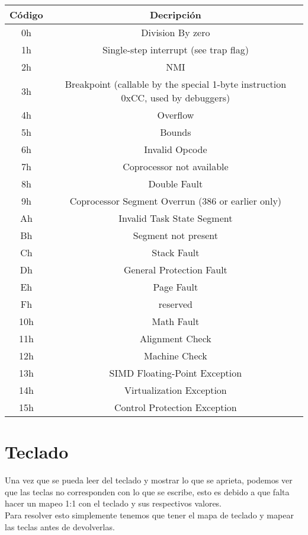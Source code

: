 \documentclass[]{article}
\begin{document}
\begin{center}
	\begin{tabular}{ |c|c| }
		\hline
		C\'odigo & Decripci\'on\\
		\hline
		0h & Division By zero\\
		1h & Single-step interrupt (see trap flag) \\
		2h & NMI\\
		3h & Breakpoint (callable by the special 1-byte instruction 0xCC, used by debuggers) \\
		4h & Overflow\\
		5h & Bounds\\
		6h & Invalid Opcode \\
		7h & Coprocessor not available \\
		8h & Double Fault\\
		9h & Coprocessor Segment Overrun (386 or earlier only) \\
		Ah & Invalid Task State Segment \\
		Bh & Segment not present \\
		Ch & Stack Fault \\
		Dh & General Protection Fault\\
		Eh & Page Fault\\
		Fh & reserved\\
		10h & Math Fault \\
		11h & Alignment Check \\
		12h & Machine Check \\
		13h & SIMD Floating-Point Exception \\
		14h & Virtualization Exception \\
		15h & Control Protection Exception \\
		\hline
	\end{tabular}
\end{center}

\section*{Teclado}
Una vez que se pueda leer del teclado y mostrar lo que se aprieta, podemos ver que las teclas
no corresponden con lo que se escribe, esto es debido a que falta hacer un mapeo 1:1 con el teclado y sus respectivos valores. \\

Para resolver esto simplemente tenemos que tener el mapa de teclado y mapear las teclas antes de devolverlas.
\end{document}
